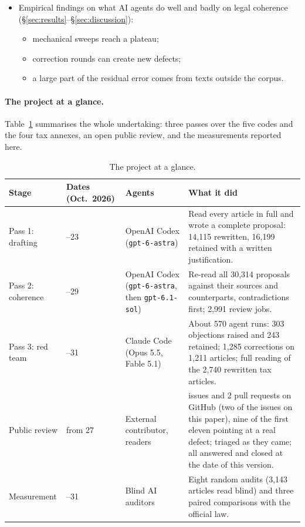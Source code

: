 \documentclass[11pt,a4paper]{article}
\begin{document}
\begin{itemize}
  \item Empirical findings on what AI agents do well and badly on legal coherence (\S\ref{sec:results}--\S\ref{sec:discussion}):
  \begin{itemize}
    \item mechanical sweeps reach a plateau;
    \item correction rounds can create new defects;
    \item a large part of the residual error comes from texts outside the corpus.
  \end{itemize}
\end{itemize}

\paragraph{The project at a glance.}
Table~\ref{tab:glance} summarises the whole undertaking: three passes over the five codes and the four tax annexes, an open public review, and the measurements reported here.

\begin{table}[ht]
\centering
\small
\begin{tabularx}{\linewidth}{>{\raggedright\arraybackslash}p{2.2cm}>{\raggedright\arraybackslash}p{1.5cm}>{\raggedright\arraybackslash}p{3.1cm}>{\raggedright\arraybackslash}X}
\toprule
Stage & Dates (Oct.\ 2026) & Agents & What it did\\
\midrule
Pass 1: drafting & 18--23 & OpenAI Codex (\texttt{gpt-6-astra}) & Read every article in full and wrote a complete proposal: 14{,}115 rewritten, 16{,}199 retained with a written justification.\\
Pass 2: coherence & 23--29 & OpenAI Codex (\texttt{gpt-6-astra}, then \texttt{gpt-6.1-sol}) & Re-read all 30{,}314 proposals against their sources and counterparts, contradictions first; 2{,}991 review jobs.\\
Pass 3: red team & 26--31 & Claude Code (Opus 5.5, Fable 5.1) & About 570 agent runs: 303 objections raised and 243 retained; 1{,}285 corrections on 1{,}211 articles; full reading of the 2{,}740 rewritten tax articles.\\
Public review & from 27 & External contributor, readers & 16 issues and 2 pull requests on GitHub (two of the issues on this paper), nine of the first eleven pointing at a real defect; triaged as they came; all answered and closed at the date of this version.\\
Measurement & 29--31 & Blind AI auditors & Eight random audits (3{,}143 articles read blind) and three paired comparisons with the official law.\\
\bottomrule
\end{tabularx}
\caption{The project at a glance.}
\label{tab:glance}
\end{table}
\end{document}
